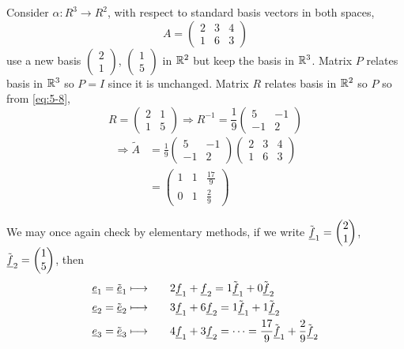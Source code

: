 \documentclass{article}
\numberwithin{equation}{section}
\begin{document}
\begin{eg}
    Consider $\alpha: R^3 \rightarrow R^2$, with respect to standard basis vectors in both spaces,
    \[
        A = \begin{pmatrix}
            2 & 3 & 4 \\
            1 & 6 & 3
        \end{pmatrix}  
    \]
    use a new basis $\begin{pmatrix}
        2 \\ 1
    \end{pmatrix}$, $\begin{pmatrix}
        1 \\ 5
    \end{pmatrix}$ in $\mathbb{R}^2$ but keep the basis in $\mathbb{R}^3$. 
    Matrix $P$ relates basis in $\mathbb{R}^3$ so $P = I$ since it is unchanged.
    Matrix $R$ relates basis in $\mathbb{R}^2$ so $P$ so from \eqref{eq:5-8},
    \[
        R = \begin{pmatrix}
            2 & 1 \\
            1 & 5
        \end{pmatrix}
        \Rightarrow R^{-1} = \frac{1}{9}\begin{pmatrix}
            5 & -1 \\
            -1 & 2
        \end{pmatrix}
    \]
    \begin{align*}
        \Rightarrow \tilde{A} &= \frac{1}{9}\begin{pmatrix}
            5 & -1 \\
            -1 & 2
        \end{pmatrix}\begin{pmatrix}
            2 & 3 & 4 \\
            1 & 6 & 3
        \end{pmatrix} \\
        &= \begin{pmatrix}
            1 & 1 & \frac{17}{9} \\[10pt]
            0 & 1 & \frac{2}{9}
        \end{pmatrix}
    \end{align*}

    We may once again check by elementary methods, 
    if we write $\tilde{\underline{f}}_1 = \begin{pmatrix}
        2 \\ 1
    \end{pmatrix}$, $\tilde{\underline{f}}_2 = \begin{pmatrix}
        1 \\ 5
    \end{pmatrix}$, then
    \begin{alignat*}{2}
        \underline{e}_1 = \tilde{\underline{e}}_1 & \longmapsto && \quad 2 \underline{f}_1 + \underline{f}_2 = 1 \tilde{\underline{f}}_1 + 0 \tilde{\underline{f}}_2 \\
        \underline{e}_2 = \tilde{\underline{e}}_2 & \longmapsto && \quad 3 \underline{f}_1 + 6 \underline{f}_2 = 1 \tilde{\underline{f}}_1 + 1 \tilde{\underline{f}}_2 \\
        \underline{e}_3 = \tilde{\underline{e}}_3 & \longmapsto && \quad 4 \underline{f}_1 + 3 \underline{f}_2 = \cdots = \frac{17}{9} \tilde{\underline{f}}_1 + \frac{2}{9} \tilde{\underline{f}}_2
    \end{alignat*}
\end{eg}
\end{document}
